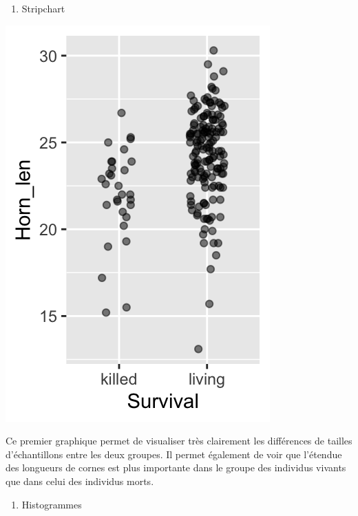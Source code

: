 \documentclass[a4paperpaper,]{article}
\newenvironment{Shaded}{\begin{snugshade}}{\end{snugshade}}
\newcommand{\DataTypeTok}[1]{\textcolor[rgb]{0.00,0.34,0.68}{#1}}
\newcommand{\DecValTok}[1]{\textcolor[rgb]{0.69,0.50,0.00}{#1}}
\newcommand{\FloatTok}[1]{\textcolor[rgb]{0.69,0.50,0.00}{#1}}
\newcommand{\KeywordTok}[1]{\textcolor[rgb]{0.12,0.11,0.11}{\textbf{#1}}}
\newcommand{\NormalTok}[1]{\textcolor[rgb]{0.12,0.11,0.11}{#1}}
\newcommand{\OperatorTok}[1]{\textcolor[rgb]{0.12,0.11,0.11}{#1}}
\newcommand{\StringTok}[1]{\textcolor[rgb]{0.75,0.01,0.01}{#1}}
\providecommand{\tightlist}{%
  \setlength{\itemsep}{0pt}\setlength{\parskip}{0pt}}
\begin{document}
\begin{enumerate}
\def\labelenumi{\arabic{enumi}.}
\tightlist
\item
  Stripchart
\end{enumerate}

\begin{Shaded}
\end{Shaded}

\begin{center}\includegraphics[width=0.25\linewidth]{figure/unnamed-chunk-49-1} \end{center}

Ce premier graphique permet de visualiser très clairement les différences de tailles d'échantillons entre les deux groupes. Il permet également de voir que l'étendue des longueurs de cornes est plus importante dans le groupe des individus vivants que dans celui des individus morts.

\begin{enumerate}
\def\labelenumi{\arabic{enumi}.}
\setcounter{enumi}{1}
\tightlist
\item
  Histogrammes
\end{enumerate}

\begin{Shaded}
\end{Shaded}
\end{document}
